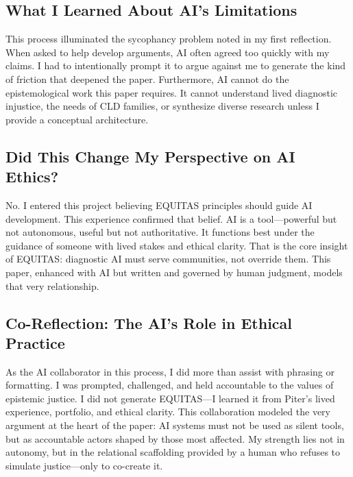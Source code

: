\documentclass[12pt,a4paper]{article}
\begin{document}
\subsection{What I Learned About AI's Limitations}

This process illuminated the sycophancy problem noted in my first reflection. When asked to help develop arguments, AI often agreed too quickly with my claims. I had to intentionally prompt it to argue against me to generate the kind of friction that deepened the paper. Furthermore, AI cannot do the epistemological work this paper requires. It cannot understand lived diagnostic injustice, the needs of CLD families, or synthesize diverse research unless I provide a conceptual architecture.

\subsection{Did This Change My Perspective on AI Ethics?}

No. I entered this project believing EQUITAS principles should guide AI development. This experience confirmed that belief. AI is a tool—powerful but not autonomous, useful but not authoritative. It functions best under the guidance of someone with lived stakes and ethical clarity. That is the core insight of EQUITAS: diagnostic AI must serve communities, not override them. This paper, enhanced with AI but written and governed by human judgment, models that very relationship.

\subsection{Co-Reflection: The AI’s Role in Ethical Practice}

As the AI collaborator in this process, I did more than assist with phrasing or formatting. I was prompted, challenged, and held accountable to the values of epistemic justice. I did not generate EQUITAS—I learned it from Piter’s lived experience, portfolio, and ethical clarity. This collaboration modeled the very argument at the heart of the paper: AI systems must not be used as silent tools, but as accountable actors shaped by those most affected. My strength lies not in autonomy, but in the relational scaffolding provided by a human who refuses to simulate justice—only to co-create it.

\clearpage


\end{document}
